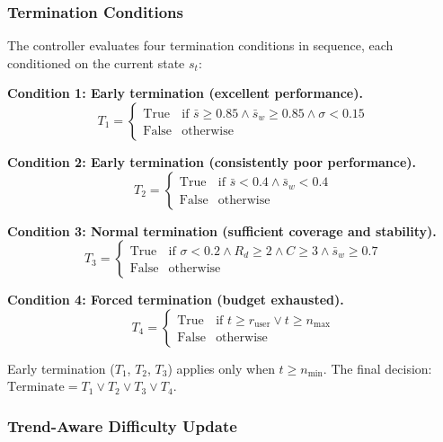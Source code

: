 ﻿\documentclass[final,3p,times,authoryear]{elsarticle}
\begin{document}
\subsubsection{Termination Conditions}

\noindent The controller evaluates four termination conditions in sequence, each conditioned on the current state $s_t$:

\textbf{Condition 1: Early termination (excellent performance).}
\begin{equation}
T_1 = \begin{cases}
\text{True} & \text{if } \bar{s} \geq 0.85 \land \bar{s}_w \geq 0.85 \land \sigma < 0.15 \\
\text{False} & \text{otherwise}
\end{cases}
\end{equation}

\textbf{Condition 2: Early termination (consistently poor performance).}
\begin{equation}
T_2 = \begin{cases}
\text{True} & \text{if } \bar{s} < 0.4 \land \bar{s}_w < 0.4 \\
\text{False} & \text{otherwise}
\end{cases}
\end{equation}

\textbf{Condition 3: Normal termination (sufficient coverage and stability).}
\begin{equation}
T_3 = \begin{cases}
\text{True} & \text{if } \sigma < 0.2 \land R_d \geq 2 \land C \geq 3 \land \bar{s}_w \geq 0.7 \\
\text{False} & \text{otherwise}
\end{cases}
\end{equation}

\textbf{Condition 4: Forced termination (budget exhausted).}
\begin{equation}
T_4 = \begin{cases}
\text{True} & \text{if } t \geq r_{\text{user}} \lor t \geq n_{\max} \\
\text{False} & \text{otherwise}
\end{cases}
\end{equation}

Early termination ($T_1$, $T_2$, $T_3$) applies only when $t \geq n_{\min}$. The final decision: $\text{Terminate} = T_1 \lor T_2 \lor T_3 \lor T_4$.

\subsubsection{Trend-Aware Difficulty Update}
\end{document}
